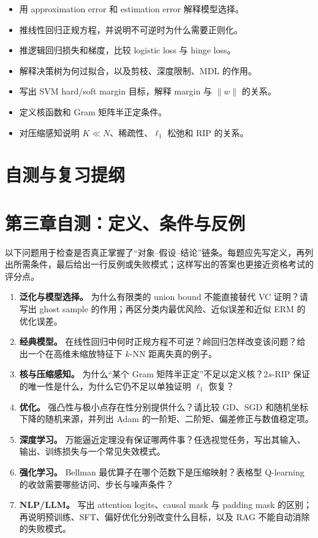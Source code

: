 \begin{itemize}
  \item 用 approximation error 和 estimation error 解释模型选择。
  \item 推线性回归正规方程，并说明不可逆时为什么需要正则化。
  \item 推逻辑回归损失和梯度，比较 logistic loss 与 hinge loss。
  \item 解释决策树为何过拟合，以及剪枝、深度限制、MDL 的作用。
  \item 写出 SVM hard/soft margin 目标，解释 margin 与 \(\|w\|\) 的关系。
  \item 定义核函数和 Gram 矩阵半正定条件。
  \item 对压缩感知说明 \(K\ll N\)、稀疏性、\(\ell_1\) 松弛和 RIP 的关系。
\end{itemize}



\section{自测与复习提纲}

\section{第三章自测：定义、条件与反例}

以下问题用于检查是否真正掌握了“对象--假设--结论”链条。每题应先写定义，再列出所需条件，最后给出一行反例或失败模式；这样写出的答案也更接近资格考试的评分点。

\begin{enumerate}
  \item \textbf{泛化与模型选择。} 为什么有限类的 union bound 不能直接替代 VC 证明？请写出 ghost sample 的作用；再区分类内最优风险、近似误差和近似 ERM 的优化误差。
  \item \textbf{经典模型。} 在线性回归中何时正规方程不可逆？岭回归怎样改变该问题？给出一个在高维未缩放特征下 \(k\)-NN 距离失真的例子。
  \item \textbf{核与压缩感知。} 为什么“某个 Gram 矩阵半正定”不足以定义核？\(2s\)-RIP 保证的唯一性是什么，为什么它仍不足以单独证明 \(\ell_1\) 恢复？
  \item \textbf{优化。} 强凸性与极小点存在性分别提供什么？请比较 GD、SGD 和随机坐标下降的随机来源，并列出 Adam 的一阶矩、二阶矩、偏差修正与数值稳定项。
  \item \textbf{深度学习。} 万能逼近定理没有保证哪两件事？任选视觉任务，写出其输入、输出、训练损失与一个常见失效模式。
  \item \textbf{强化学习。} Bellman 最优算子在哪个范数下是压缩映射？表格型 Q-learning 的收敛需要哪些访问、步长与噪声条件？
  \item \textbf{NLP/LLM。} 写出 attention logits、causal mask 与 padding mask 的区别；再说明预训练、SFT、偏好优化分别改变什么目标，以及 RAG 不能自动消除的失败模式。
\end{enumerate}

